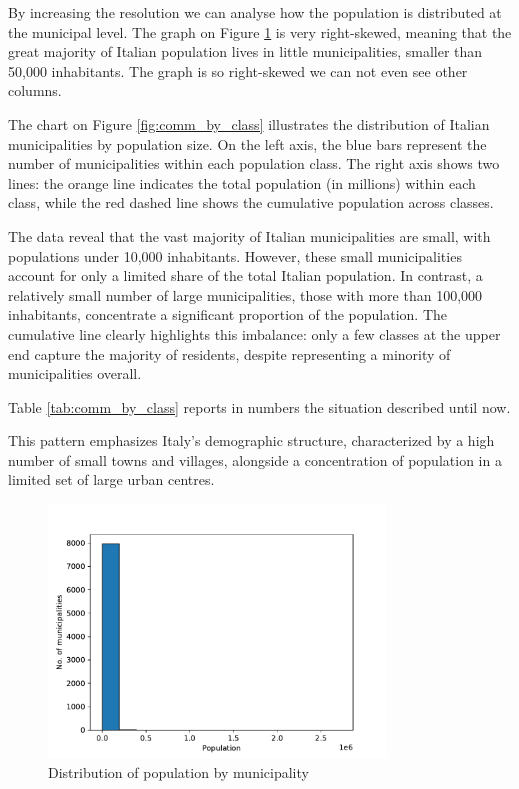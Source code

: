 

By increasing the resolution we can analyse how the population is distributed at the municipal level.
The graph on Figure \ref{hist:pop_by_comm} is very right-skewed, meaning that the great majority of Italian population lives in little municipalities, smaller than 50,000 inhabitants.
The graph is so right-skewed we can not even see other columns.

The chart on Figure \ref{fig:comm_by_class} illustrates the distribution of Italian municipalities by population size.
On the left axis, the blue bars represent the number of municipalities within each population class. 
The right axis shows two lines: the orange line indicates the total population (in millions) within each class, while the red dashed line shows the cumulative population across classes.

The data reveal that the vast majority of Italian municipalities are small, with populations under 10,000 inhabitants. 
However, these small municipalities account for only a limited share of the total Italian population. 
In contrast, a relatively small number of large municipalities, those with more than 100,000 inhabitants, concentrate a significant proportion of the population. 
The cumulative line clearly highlights this imbalance: only a few classes at the upper end capture the majority of residents, despite representing a minority of municipalities overall.

Table \ref{tab:comm_by_class} reports in numbers the situation described until now. 

This pattern emphasizes Italy’s demographic structure, characterized by a high number of small towns and villages, alongside a concentration of population in a limited set of large urban centres.

\begin{figure}[tbp]
	\centering
	\includegraphics[width=0.8\textwidth]{img/pop_by_comm_hist.pdf}
	\caption{Distribution of population by municipality}
	\label{hist:pop_by_comm}
\end{figure}

